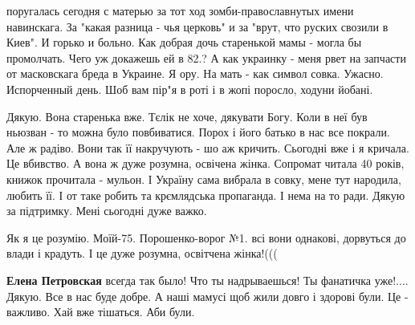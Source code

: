 \begin{itemize}
поругалась сегодня с матерью за тот ход зомби-православнутых имени навинскага.
За "какая разница - чья церковь" и за "врут, что руских свозили в Киев". И
горько и больно. Как добрая дочь старенькой мамы - могла бы промолчать. Чего уж
докажешь ей в 82.? А как украинку - меня рвет на запчасти от масковскага бреда
в Украине. Я ору. На мать - как символ совка. Ужасно. Испорченный день. Шоб вам
пір"я в роті і в жопі поросло, ходуни йобані.

\begin{itemize}
 

Дякую. Вона старенька вже. Тєлік не хоче, дякувати Богу. Коли в неї був ньюзван
- то можна було повбиватися. Порох і його батько в нас все покрали. Але ж
радіво. Вони так її накручують - шо аж кричить. Сьогодні вже і я кричала. Це
вбивство. А вона ж дуже розумна, освічена жінка. Сопромат читала 40 років,
книжок прочитала - мульон. І Україну сама вибрала в совку, мене тут народила,
любить її. І от таке робить та крємлядська пропаганда. І нема на то ради. Дякую
за підтримку. Мені сьогодні дуже важко.


 
Як я це розумію. Моїй-75. Порошенко-ворог №1. всі вони однакові, дорвуться до влади і крадуть. І це дуже розумна, освітчена жінка!(((

 
\textbf{Елена Петровская} всегда так было! Что ты надрываешься! Ты фанатичка уже!.... Дякую. Все в нас буде добре. А наші мамусі щоб жили довго і здорові були. Це - важливо. Хай вже тішаться. Аби були.

 

\end{itemize}
\end{itemize}

